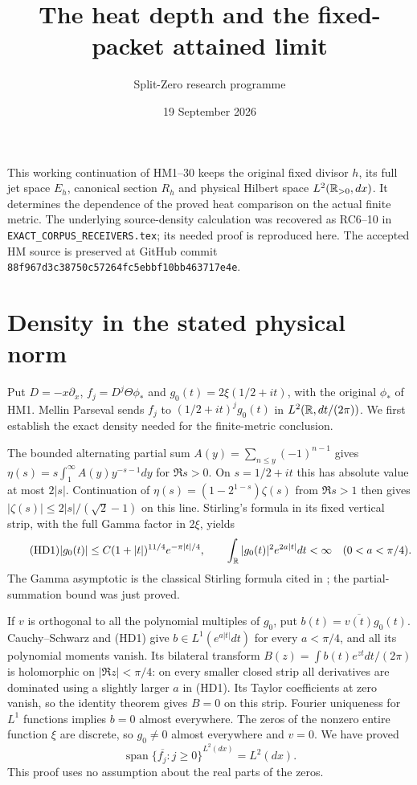 \documentclass[11pt]{article}
\title{The heat depth and the fixed-packet attained limit}
\author{Split-Zero research programme}\date{19 September 2026}
\begin{document}
\maketitle
This working continuation of HM1--30 keeps the original fixed divisor
$h$, its full jet space $E_h$, canonical section $R_h$ and physical
Hilbert space $L^2(\mathbb R_{>0},dx)$. It determines the dependence of the
proved heat comparison on the actual finite metric. The underlying
source-density calculation was recovered as RC6--10 in
\texttt{EXACT\_CORPUS\_RECEIVERS.tex}; its needed proof is reproduced
here. The accepted HM source is preserved at GitHub commit
\texttt{88f967d3c38750c57264fc5ebbf10bb463717e4e}.

\section{Density in the stated physical norm}
Put $D=-x\partial_x$, $f_j=D^j\Theta\phi_*$ and
$g_0(t)=2\xi(1/2+it)$, with the original $\phi_*$ of HM1.
Mellin Parseval sends $f_j$ to $(1/2+it)^jg_0(t)$ in
$L^2(\mathbb R,dt/(2\pi))$. We first establish the exact density needed
for the finite-metric conclusion.

The bounded alternating partial sum
$A(y)=\sum_{n\le y}(-1)^{n-1}$ gives
$\eta(s)=s\int_1^\infty A(y)y^{-s-1}dy$ for $\Re s>0$.
On $s=1/2+it$ this has absolute value at most $2|s|$.
Continuation of $\eta(s)=(1-2^{1-s})\zeta(s)$ from $\Re s>1$
then gives $|\zeta(s)|\le2|s|/(\sqrt2-1)$ on this line.
Stirling's formula in its fixed vertical strip, with the full Gamma
factor in $2\xi$, yields
\begin{equation}\tag{HD1}
 |g_0(t)|\le C(1+|t|)^{11/4}e^{-\pi|t|/4},\qquad
 \int_\mathbb R |g_0(t)|^2e^{2a|t|}dt<\infty\quad(0<a<\pi/4).
\end{equation}
The Gamma asymptotic is the classical Stirling formula cited in
\cite{gamma}; the partial-summation bound was just proved.

If $v$ is orthogonal to all the polynomial multiples of $g_0$, put
$b(t)=\overline{v(t)}g_0(t)$. Cauchy--Schwarz and (HD1) give
$b\in L^1(e^{a|t|}dt)$ for every $a<\pi/4$, and all its polynomial
moments vanish. Its bilateral transform
$B(z)=\int b(t)e^{zt}dt/(2\pi)$ is holomorphic on $|\Re z|<\pi/4$:
on every smaller closed strip all derivatives are dominated using a
slightly larger $a$ in (HD1). Its Taylor coefficients at zero vanish,
so the identity theorem gives $B=0$ on this strip. Fourier uniqueness
for $L^1$ functions \cite{Fourier} implies $b=0$ almost everywhere.
The zeros of the nonzero entire function $\xi$ are discrete, so
$g_0\ne0$ almost everywhere and $v=0$. We have proved
\begin{equation}\tag{HD2}
 \overline{\operatorname{span}\{f_j:j\ge0\}}^{L^2(dx)}=L^2(dx).
\end{equation}
This proof uses no assumption about the real parts of the zeros.
\end{document}
